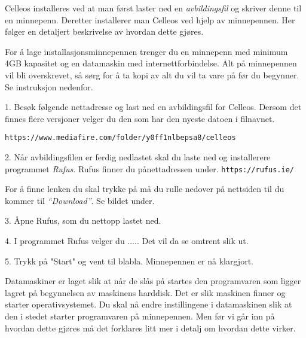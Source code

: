 \topglue 1pc

Celleos installeres ved at man f\o rst laster ned en {\it avbildingsfil} og skriver denne til en minnepenn. Deretter installerer man Celleos ved hjelp av minnepennen. Her f\o lger en detaljert beskrivelse av hvordan dette gj\o res.


For \aa{} lage installasjonsminnepennen trenger du en minnepenn med minimum 4GB kapasitet og en datamaskin med internettforbindelse. Alt p\aa{} minnepennen vil bli overskrevet, s\aa{} s\o rg for \aa{} ta kopi av alt du vil ta vare p\aa{} f\o r du begynner. Se instruksjon nedenfor.
\item{1.} Bes\o k f\o lgende nettadresse og last ned en avbildingsfil for Celleos. Dersom det finnes flere versjoner velger du den som har den nyeste datoen i filnavnet.

\smallskip

{\tt https://www.mediafire.com/folder/y0ff1nlbepsa8/celleos}

\vskip 4pt

\item{2.} N\aa r avbildingsfilen er ferdig nedlastet skal du laste ned og installerere programmet {\it Rufus}. Rufus finner du p\aa{}nettadressen under. 
\smallskip
{\tt https://rufus.ie/}
\smallskip
\item{} For \aa{} finne lenken du skal trykke p\aa{} m\aa{} du rulle nedover p\aa{} nettsiden til du kommer til {\it``Download''}. Se bildet under.
\smallskip
\epsfxsize 6cm

\item{3.} \AA pne Rufus, som du nettopp lastet ned.
\item{4.} I programmet Rufus velger du .....
Det vil da se omtrent slik ut.
\item{5.} Trykk p\aa{} "Start" og vent til blabla. Minnepennen er n\aa{} klargjort.


Datamaskiner er laget slik at n\aa r de sl\aa s p\aa{} startes den programvaren som ligger lagret p\aa{} begynnelsen av maskinens harddisk. Det er slik maskinen finner og starter operativsystemet. Du skal n\aa{} endre instillingene i datamaskinen slik at den i stedet starter programvaren p\aa{} minnepennen. Men f\o r vi g\aa r inn p\aa{} hvordan dette gj\o res m\aa{} det forklares litt mer i detalj om hvordan dette virker.

